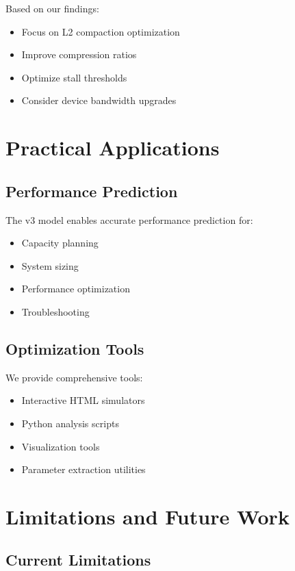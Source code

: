 \documentclass[11pt,twocolumn]{article}
\begin{document}
Based on our findings:
\begin{itemize}
    \item Focus on L2 compaction optimization
    \item Improve compression ratios
    \item Optimize stall thresholds
    \item Consider device bandwidth upgrades
\end{itemize}

\section{Practical Applications}

\subsection{Performance Prediction}

The v3 model enables accurate performance prediction for:
\begin{itemize}
    \item Capacity planning
    \item System sizing
    \item Performance optimization
    \item Troubleshooting
\end{itemize}

\subsection{Optimization Tools}

We provide comprehensive tools:
\begin{itemize}
    \item Interactive HTML simulators
    \item Python analysis scripts
    \item Visualization tools
    \item Parameter extraction utilities
\end{itemize}

\section{Limitations and Future Work}

\subsection{Current Limitations}
\end{document}

